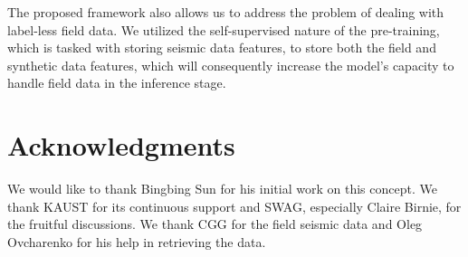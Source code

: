\documentclass{article}
\begin{document}
The proposed framework also allows us to address the problem of dealing with label-less field data. We utilized the self-supervised nature of the pre-training, which is tasked with storing seismic data features, to store both the field and synthetic data features, which will consequently increase the model's capacity to handle field data in the inference stage.

\section*{Acknowledgments}
We would like to thank Bingbing Sun for his initial work on this concept. We thank KAUST for its continuous support and SWAG, especially Claire Birnie, for the fruitful discussions. We thank CGG for the field seismic data and Oleg Ovcharenko for his help in retrieving the data.

  
  
\end{document}
